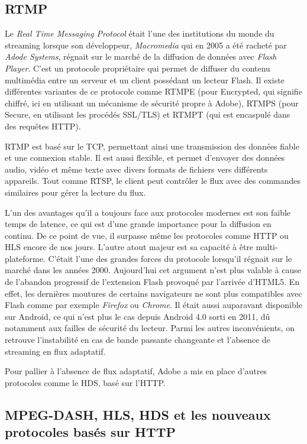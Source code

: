 \documentclass{polytech/polytech}
\begin{document}
\subsection{RTMP}

Le \textit{Real Time Messaging Protocol} était l’une des institutions du monde du streaming lorsque son développeur, \textit{Macromedia} qui en 2005 a été racheté par \textit{Adode Systems}, régnait sur le marché de la diffusion de données avec \textit{Flash Player}. C’est un protocole propriétaire qui permet de diffuser du contenu multimédia entre un serveur et un client possédant un lecteur Flash. Il existe différentes variantes de ce protocole comme RTMPE (pour Encrypted, qui signifie chiffré, ici en utilisant un mécanisme de sécurité propre à Adobe), RTMPS (pour Secure, en utilisant les procédés SSL/TLS) et RTMPT (qui est encaspulé dans des requêtes HTTP).

RTMP est basé sur le TCP, permettant ainsi une transmission des données fiable et une connexion stable. Il est aussi flexible, et permet d’envoyer des données audio, vidéo et même texte avec divers formats de fichiers vers différents appareils. Tout comme RTSP, le client peut contrôler le flux avec des commandes similaires pour gérer la lecture du flux.

L’un des avantages qu’il a toujours face aux protocoles modernes est son faible temps de latence, ce qui est d’une grande importance pour la diffusion en continu. De ce point de vue, il surpasse même les protocoles comme HTTP ou HLS encore de nos jours. L’autre atout majeur est sa capacité à être multi-plateforme. C’était l’une des grandes forces du protocole lorsqu’il régnait sur le marché dans les années 2000. Aujourd’hui cet argument n’est plus valable à cause de l’abandon progressif de l’extension Flash provoqué par l’arrivée d’HTML5. En effet, les dernières moutures de certains navigateurs ne sont plus compatibles avec Flash comme par exemple \textit{Firefox} ou \textit{Chrome}. Il était aussi auparavant disponible sur Android, ce qui n’est plus le cas depuis Android 4.0 sorti en 2011, dû notamment aux failles de sécurité du lecteur. Parmi les autres inconvénients, on retrouve l’instabilité en cas de bande passante changeante et l’absence de streaming en flux adaptatif.

Pour pallier à l’absence de flux adaptatif, Adobe a mis en place d’autres protocoles comme le HDS, basé sur l’HTTP.


\subsection{MPEG-DASH, HLS, HDS et les nouveaux protocoles basés sur HTTP}
\label{subsec:newProto}
\end{document}
